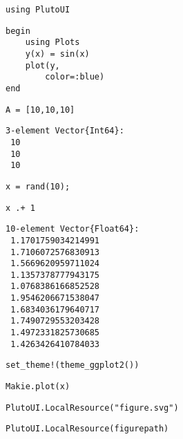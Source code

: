 \newpage

\begin{lstlisting}[language=JuliaLocal, style=julia]
using PlutoUI
\end{lstlisting}

\begin{lstlisting}[language=JuliaLocal, style=julia]
begin
	using Plots
	y(x) = sin(x)
	plot(y,
		color=:blue)
end
\end{lstlisting}

\begin{lstlisting}[language=JuliaLocal, style=julia]
A = [10,10,10]
\end{lstlisting}

\begin{verbatim}
3-element Vector{Int64}:
 10
 10
 10
\end{verbatim}

\begin{lstlisting}[language=JuliaLocal, style=julia]
x = rand(10);
\end{lstlisting}

\begin{lstlisting}[language=JuliaLocal, style=julia]
x .+ 1
\end{lstlisting}

\begin{verbatim}
10-element Vector{Float64}:
 1.1701759034214991
 1.7106072576830913
 1.5669620959711024
 1.1357378777943175
 1.0768386166852528
 1.9546206671538047
 1.6834036179640717
 1.7490729553203428
 1.4972331825730685
 1.4263426410784033
\end{verbatim}

\begin{lstlisting}[language=JuliaLocal, style=julia]
set_theme!(theme_ggplot2())
\end{lstlisting}

\begin{lstlisting}[language=JuliaLocal, style=julia]
Makie.plot(x)
\end{lstlisting}

\begin{lstlisting}[language=JuliaLocal, style=julia]
PlutoUI.LocalResource("figure.svg")
\end{lstlisting}

\begin{lstlisting}[language=JuliaLocal, style=julia]
PlutoUI.LocalResource(figurepath)
\end{lstlisting}
